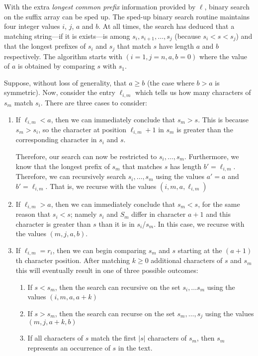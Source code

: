 With the extra \emph{longest common prefix} information provided by
$\ell$, binary search on the suffix array can be sped up.  The sped-up
binary search routine maintains four integer values $i$, $j$, $a$ and $b$.
At all times, the search has deduced that a matching string---if it is
exists---is among $s_i,s_{i+1},\ldots,s_j$ (because $s_i < s < s_j$) and
that the longest prefixes of $s_i$ and $s_j$ that match $s$ have length
$a$ and $b$ respectively. The algorithm starts with $(i=1,j=n,a,b=0)$
where the value of $a$ is obtained by comparing $s$ with $s_1$.

Suppose, without loss of generality, that $a \ge b$ (the case where $b>a$ is symmetric).  Now, consider the entry $\ell_{i,m}$ which tells us how many characters of $s_m$ match $s_i$.  There are three cases to consider:
\begin{enumerate}
\item If $\ell_{i,m}< a$, then we can immediately conclude that $s_m > s$. This is because $s_m > s_i$, so the character at position 
$\ell_{i,m}+1$ in $s_m$ is greater than the corresponding character in $s_i$ and $s$.

Therefore, our search can now be restricted to $s_i,\ldots,s_{m}$.  Furthermore, we know that the longest prefix of $s_m$ that matches $s$ has length $b'=\ell_{i,m}$.  Therefore, we can recursively search $s_i,\ldots,s_{m}$ using the values $a'=a$ and $b'=\ell_{i,m}$. That is, we recurse with the values $(i,m,a,\ell_{i,m})$

\item If $\ell_{i,m} > a$, then we can immediately conclude that $s_m < s$, for the same reason that $s_i < s$; namely $s_i$ and $S_m$ differ in character $a+1$ and this character is greater than $s$ than it is in $s_i$/$s_m$.
In this case, we recurse with the values $(m,j,a, b)$.

\item If $\ell_{i,m}= r_i$, then we can begin comparing $s_m$ and $s$ starting at the $(a+1)$th character position. After matching $k\ge0$ additional characters of $s$ and $s_m$ this will eventually result in one of three possible outcomes:
\begin{enumerate}
  \item If $s < s_m$, then the search can recursive on the set $s_i,\ldots s_m$ using the values $(i,m,a,a+k)$

  \item If $s > s_m$, then the search can recurse on the set $s_m,\ldots,s_j$ using the values $(m,j,a+k, b)$

  \item If all characters of $s$ match the first $|s|$ characters of $s_m$, then $s_m$ represents an occurrence of $s$ in the text.
\end{enumerate}
\end{enumerate}


